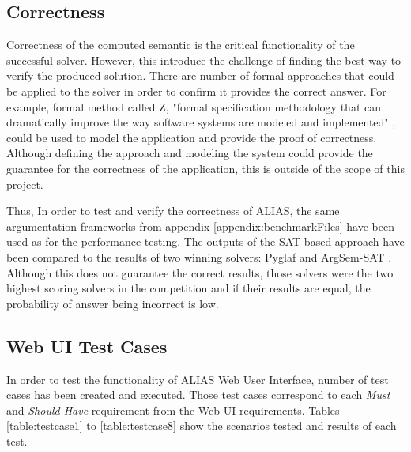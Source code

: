 \subsection{Correctness}
Correctness of the computed semantic is the critical functionality of the successful solver. However, this introduce the challenge of finding the best way to verify the produced solution. There are number of formal approaches that could be applied to the solver in order to confirm it provides the correct answer. For example, formal method called Z, "formal specification methodology that can dramatically improve the way software systems are modeled and implemented" \citep{potter1996introduction}, could be used to model the application and provide the proof of correctness. Although defining the approach and modeling the system could provide the guarantee for the correctness of the application, this is outside of the scope of this project. 

Thus, In order to test and verify the correctness of ALIAS, the same argumentation frameworks from appendix \ref{appendix:benchmarkFiles} have been used as for the performance testing. The outputs of the SAT based approach have been compared to the results of two winning solvers: Pyglaf \citep{pyglaf} and ArgSem-SAT \citep{argsemsat}. Although this does not guarantee the correct results, those solvers were the two highest scoring solvers in the competition and if their results are equal, the probability of answer being incorrect is low.

\subsection{Web UI Test Cases} \label{section:testCases}
In order to test the functionality of ALIAS Web User Interface, number of test cases has been created and executed. Those test cases correspond to each \textit{Must} and \textit{Should Have} requirement from the Web UI requirements. Tables \ref{table:testcase1} to \ref{table:testcase8} show the scenarios tested and results of each test.

